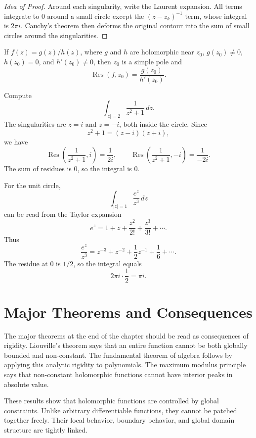 \begin{proof}[Idea of Proof]
Around each singularity, write the Laurent expansion. All terms integrate to $0$ around a small circle except the $(z-z_k)^{-1}$ term, whose integral is $2\pi i$. Cauchy's theorem then deforms the original contour into the sum of small circles around the singularities.
\end{proof}

\begin{proposition}
If $f(z)=g(z)/h(z)$, where $g$ and $h$ are holomorphic near $z_0$, $g(z_0)\neq 0$, $h(z_0)=0$, and $h'(z_0)\neq 0$, then $z_0$ is a simple pole and
\[
    \operatorname{Res}(f,z_0)=\frac{g(z_0)}{h'(z_0)}.
\]
\end{proposition}

\begin{example}
Compute
\[
    \int_{|z|=2}\frac{1}{z^2+1}\,dz.
\]
The singularities are $z=i$ and $z=-i$, both inside the circle. Since
\[
    z^2+1=(z-i)(z+i),
\]
we have
\[
    \operatorname{Res}\left(\frac{1}{z^2+1},i\right)=\frac{1}{2i},
    \qquad
    \operatorname{Res}\left(\frac{1}{z^2+1},-i\right)=\frac{1}{-2i}.
\]
The sum of residues is $0$, so the integral is $0$.
\end{example}



\begin{example}
For the unit circle,
\[
    \int_{|z|=1}\frac{e^z}{z^3}\,dz
\]
can be read from the Taylor expansion
\[
    e^z=1+z+\frac{z^2}{2!}+\frac{z^3}{3!}+\cdots.
\]
Thus
\[
    \frac{e^z}{z^3}=z^{-3}+z^{-2}+\frac{1}{2}z^{-1}+\frac{1}{6}+\cdots.
\]
The residue at $0$ is $1/2$, so the integral equals
\[
    2\pi i\cdot\frac{1}{2}=\pi i.
\]
\end{example}

\section{Major Theorems and Consequences}


The major theorems at the end of the chapter should be read as consequences of rigidity. Liouville's theorem says that an entire function cannot be both globally bounded and non-constant. The fundamental theorem of algebra follows by applying this analytic rigidity to polynomials. The maximum modulus principle says that non-constant holomorphic functions cannot have interior peaks in absolute value.

These results show that holomorphic functions are controlled by global constraints. Unlike arbitrary differentiable functions, they cannot be patched together freely. Their local behavior, boundary behavior, and global domain structure are tightly linked.

